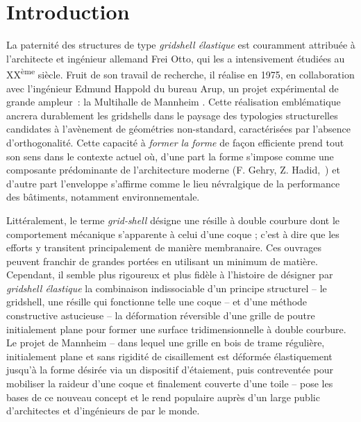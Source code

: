 
\chapter*{Introduction}\label{chp=intro}

La paternité des structures de type \emph{gridshell élastique} est couramment attribuée à l'architecte et ingénieur allemand Frei Otto, qui les a intensivement étudiées au XX\textsuperscript{ème} siècle. Fruit de son travail de recherche, il réalise en 1975, en collaboration avec l'ingénieur Edmund Happold du bureau Arup, un projet expérimental de grande ampleur~: la Multihalle de Mannheim \cite{IL13,Happold1975}. Cette réalisation emblématique ancrera durablement les gridshells dans le paysage des typologies structurelles candidates à l'avènement de géométries non-standard, caractérisées par l'absence d'orthogonalité. Cette capacité à \emph{former la forme} de façon efficiente prend tout son sens dans le contexte actuel où, d'une part la forme s'impose comme une composante prédominante de l'architecture moderne (F. Gehry, Z. Hadid,~\telp{}) et d'autre part l'enveloppe s'affirme comme le lieu névralgique de la performance des bâtiments, notamment environnementale.

Littéralement, le terme \emph{grid-shell} désigne une résille à double courbure dont le comportement mécanique s'apparente à celui d'une coque ; c'est à dire que les efforts y transitent principalement de manière membranaire. Ces ouvrages peuvent franchir de grandes portées en utilisant un minimum de matière. Cependant, il semble plus rigoureux et plus fidèle à l'histoire de désigner par \emph{gridshell élastique} la combinaison indissociable d'un principe structurel -- le gridshell, une résille qui fonctionne telle une coque -- et d'une méthode constructive astucieuse -- la déformation réversible d'une grille de poutre initialement plane pour former une surface tridimensionnelle à double courbure. Le projet de Mannheim -- dans lequel une grille en bois de trame régulière, initialement plane et sans rigidité de cisaillement est déformée élastiquement jusqu'à la forme désirée via un dispositif d'étaiement, puis contreventée pour mobiliser la raideur d'une coque et finalement couverte d'une toile -- pose les bases de ce nouveau concept et le rend populaire auprès d'un large public d'architectes et d'ingénieurs de par le monde.


